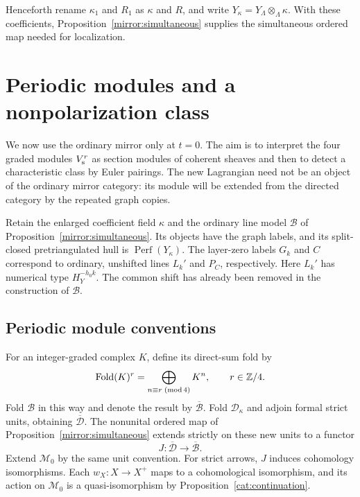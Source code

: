\documentclass[11pt]{article}
\theoremstyle{definition}
\theoremstyle{remark}
\numberwithin{equation}{section}
\begin{document}
Henceforth rename $\kappa_1$ and $R_1$ as $\kappa$ and $R$, and
write $Y_\kappa=Y_\Lambda\otimes_\Lambda\kappa$.  With these
coefficients, Proposition~\ref{mirror:simultaneous} supplies the
simultaneous ordered map needed for localization.

\section{Periodic modules and a nonpolarization class}
\label{per:section}

We now use the ordinary mirror only at $t=0$.  The aim is to interpret
the four graded modules $V_{\rm s}^r$ as section modules of coherent
sheaves and then to detect a characteristic class by Euler pairings.
The new Lagrangian need not be an object of the ordinary mirror
category: its module will be extended from the directed category by
the repeated graph copies.

Retain the enlarged coefficient field $\kappa$ and the ordinary line
model $\mathcal B$ of Proposition~\ref{mirror:simultaneous}.  Its objects
have the graph labels, and its split-closed pretriangulated hull is
$\operatorname{Perf}(Y_\kappa)$.  The layer-zero labels $G_k$ and $C$ correspond to
ordinary, unshifted lines $L_k'$ and $P_C$, respectively.  Here $L_k'$
has numerical type $H_Y^{-h_0k}$.  The common shift has already been
removed in the construction of $\mathcal B$.

\subsection{Periodic module conventions}

For an integer-graded complex $K$, define its direct-sum fold by
\begin{equation}
 \operatorname{Fold}(K)^r
   =\bigoplus_{n\equiv r\;({\rm mod}\,4)}K^n,
 \qquad r\in\mathbb Z/4.
 \label{per:fold}
\end{equation}
Fold $\mathcal B$ in this way and denote the result by
$\overline{\mathcal B}$.  Fold $\mathcal D_\kappa$ and adjoin formal
strict units, obtaining $\overline{\mathcal D}$.  The nonunital ordered
map of Proposition~\ref{mirror:simultaneous} extends strictly on these
new units to a functor
\begin{equation}
 J:\overline{\mathcal D}\longrightarrow\overline{\mathcal B}.
 \label{per:functor}
\end{equation}
Extend $\mathcal M_0$ by the same unit convention.  For strict arrows,
$J$ induces cohomology isomorphisms.  Each $w_X:X\to X^+$ maps to a
cohomological isomorphism, and its action on $\mathcal M_0$ is a
quasi-isomorphism by Proposition~\ref{cat:continuation}.
\end{document}
